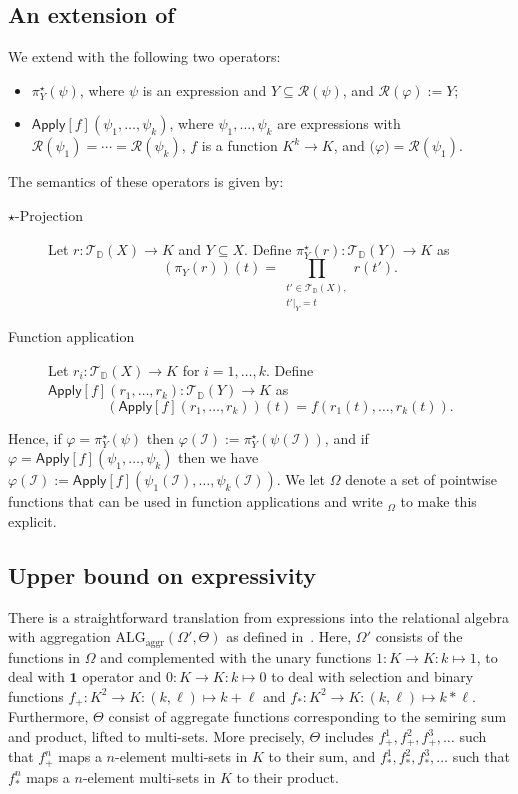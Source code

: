 \subsection{An extension of \ARA}
We extend \ARA with the following two operators:
\begin{itemize}
 \item $\pi_Y^\star(\psi)$, where $\psi$ is an \ARA expression and $Y \subseteq \mathcal{R}(\psi)$, and $\mathcal{R}(\varphi) := Y$;
 \item $\textsf{Apply}[f](\psi_1,\ldots,\psi_k)$, where $\psi_1,\ldots,\psi_k$ are \ARA expressions with $\mathcal{R}(\psi_1)=\cdots=\mathcal{R}(\psi_k)$, 
 $f$ is a function $K^k\to K$,
 and 
 $\mathcal(\varphi)=\mathcal{R}(\psi_1)$.
\end{itemize}
The semantics of these operators is given by:
\begin{description}
\item[$\star$-Projection] Let $r: \mathcal{T}_{\mathbb{D}}(X) \to K$ and $Y \subseteq X$. Define $\pi_{Y}^\star(r): \mathcal{T}_{\mathbb{D}}(Y) \to K$ as
\[
(\pi_{Y}(r))(t) = \prod_{\substack{t' \in \mathcal{T}_{\mathbb{D}}(X),\\ t'|_{Y} = t}} \!\! r(t').
\]
\item[Function application] Let $r_{i}: \mathcal{T}_{\mathbb{D}}(X) \to K$ for $i=1,\ldots,k$. Define $\textsf{Apply}[f](r_1,\ldots,r_k): \mathcal{T}_{\mathbb{D}}(Y) \to K$ as
\[
(\textsf{Apply}[f](r_1,\ldots,r_k))(t) = f(r_1(t),\ldots,r_k(t)).
\]
\end{description}
Hence, if $\varphi=\pi^\star_{Y}(\psi)$ then 
$\varphi(\mathcal{I}):=\pi^\star_{Y}(\psi(\mathcal{I}))$, and
if $\varphi=\textsf{Apply}[f](\psi_1,\allowbreak \ldots,\psi_k)$ then we have
$\varphi(\mathcal{I}):=\textsf{Apply}[f](\psi_1(\mathcal{I}), \ldots,\psi_k(\mathcal{I}))$. We let $\Omega$ denote a set of pointwise functions that can be used in function applications and write \ARA$_\Omega$ to make this explicit.


\subsection{Upper bound on expressivity}
There is a straightforward translation from \ARA expressions into the relational algebra with aggregation $\text{ALG}_{\text{aggr}}(\Omega',\Theta)$ as defined in~\cite{LIBKIN2003}. Here, $\Omega'$ consists of the functions in $\Omega$ and complemented with the unary functions $1:K\to K:k\mapsto 1$, to deal with $\mathbf{1}$ operator and $0:K\to K:k\mapsto 0$ to deal with selection and binary functions $f_+:K^2\to K:(k,\ell)\mapsto k+\ell$ and $f_*:K^2\to K:(k,\ell)\mapsto k*\ell$.
Furthermore, $\Theta$ consist of aggregate functions corresponding to the semiring sum and product, lifted to multi-sets. More precisely,
$\Theta$ includes $f_+^1,f_+^2,f_+^3,\ldots$ such that $f_+^n$ maps
a $n$-element multi-sets in $K$ to their sum, and 
 $f_*^1,f_*^2,f_*^3,\ldots$ such that $f_*^n$ maps
a $n$-element multi-sets in $K$ to their product.


